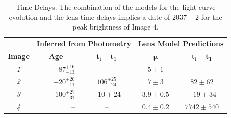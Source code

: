 \documentclass[12pt]{article}
\begin{document}
\begin{table}
\centering
\begin{tabular}{crc|cc}
    \multicolumn{1}{c}{}&
    \multicolumn{2}{c}{\textbf{Inferred from Photometry}}&\multicolumn{2}{c}{\textbf{Lens Model Predictions}}\\
    \multicolumn{1}{c}{\textbf{Image}} &\multicolumn{1}{c}{\textbf{Age}} &\multicolumn{1}{c}{$\mathbf{t_i-t_1}$}&\multicolumn{1}{c}{$\mathbf{\mu}$}
    &\multicolumn{1}{c}{$\mathbf{t_i-t_1}$}\\
    
\midrule
\textit{1}  & $87^{+16}_{-13}$ & -- & $5\pm1$ & --\\
\textit{2} & $-20^{+20}_{-11}$ & $106^{+25}_{-24}$ & $7\pm3$ & $82\pm62$ \\
\textit{3} & $100^{+27}_{-31}$ & $-10\pm24$ &$3.9\pm0.5$  & $-19\pm34$ \\
\textit{4} & -- & -- & $0.4\pm0.2$ & $7742\pm540$\\


\end{tabular}
\caption{\label{tab:time_delays}Time Delays.  The combination of the models for the light curve evolution and the lens time delays implies a date of $2037\pm2$ for the peak brightness of Image 4.}
\end{table}





\end{document}

